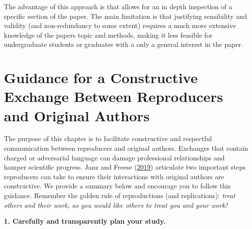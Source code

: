 \documentclass[]{book}
\begin{document}
The advantage of this approach is that allows for an in depth inspection of a specific section of the paper. The main limitation is that justifying sensibility and validity (and non-redundancy to some extent) requires a much more extensive knowledge of the papers topic and methods, making it less feasible for undergraduate students or graduates with a only a general interest in the paper.

\hypertarget{guidance-for-a-constructive-exchange-between-reproducers-and-original-authors}{%
\chapter{Guidance for a Constructive Exchange Between Reproducers and Original Authors}\label{guidance-for-a-constructive-exchange-between-reproducers-and-original-authors}}

The purpose of this chapter is to facilitate constructive and respectful communication between reproducers and original authors. Exchanges that contain charged or adversarial language can damage professional relationships and hamper scientific progress. Janz and Freese (\href{https://www.mzes.uni-mannheim.de/openscience/wp-content/uploads/2019/01/Janz-Freese_-Good-and-Bad-Replications-1.pdf}{2019}) articulate two important steps reproducers can take to ensure their interactions with original authors are constructive. We provide a summary below and encourage you to follow this guidance. Remember the golden rule of reproductions (and replications): \emph{treat others and their work, as you would like others to treat you and your work!}

\textbf{1. Carefully and transparently plan your study.}
\end{document}
